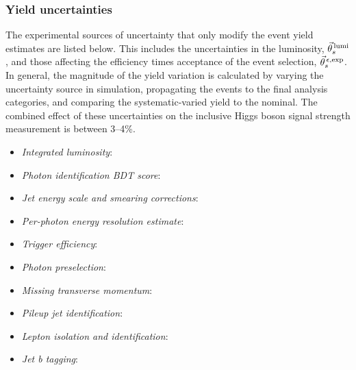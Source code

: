 \subsubsection{Yield uncertainties}
The experimental sources of uncertainty that only modify the event yield estimates are listed below. This includes the uncertainties in the luminosity, $\vec{\theta}^{\,\rm{lumi}}_{s}$, and those affecting the efficiency times acceptance of the event selection, $\vec{\theta}^{\,\epsilon,{\rm{exp}}}_{s}$. In general, the magnitude of the yield variation is calculated by varying the uncertainty source in simulation, propagating the events to the final analysis categories, and comparing the systematic-varied yield to the nominal. The combined effect of these uncertainties on the inclusive Higgs boson signal strength measurement is between 3--4\%.

\begin{itemize}
    \item \textit{Integrated luminosity}:
    
    \item \textit{Photon identification BDT score}:
    
    \item \textit{Jet energy scale and smearing corrections}:
    
    \item \textit{Per-photon energy resolution estimate}:
    
    \item \textit{Trigger efficiency}:
    
    \item \textit{Photon preselection}:
    
    \item \textit{Missing transverse momentum}:
    
    \item \textit{Pileup jet identification}:
    
    \item \textit{Lepton isolation and identification}:
    
    \item \textit{Jet b tagging}:
\end{itemize}


